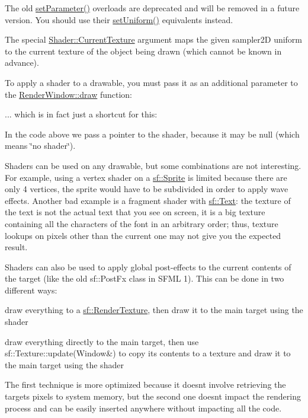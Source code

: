 The old \mbox{\hyperlink{classsf_1_1_shader_a4d6ec78f6de1a0a2146c93ab09d7d762}{set\+Parameter()}} overloads are deprecated and will be removed in a future version. You should use their \mbox{\hyperlink{classsf_1_1_shader_abf78e3bea1e9b0bab850b6b0a0de29c7}{set\+Uniform()}} equivalents instead.

The special \mbox{\hyperlink{classsf_1_1_shader_ac84c7953eec2e19358ea6e2cc5385b8d}{Shader\+::\+Current\+Texture}} argument maps the given {\ttfamily sampler2D} uniform to the current texture of the object being drawn (which cannot be known in advance).

To apply a shader to a drawable, you must pass it as an additional parameter to the \mbox{\hyperlink{classsf_1_1_render_target_a12417a3bcc245c41d957b29583556f39}{Render\+Window\+::draw}} function\+: 
\begin{DoxyCode}{0}
\end{DoxyCode}


... which is in fact just a shortcut for this\+: 
\begin{DoxyCode}{0}
\end{DoxyCode}


In the code above we pass a pointer to the shader, because it may be null (which means \char`\"{}no shader\char`\"{}).

Shaders can be used on any drawable, but some combinations are not interesting. For example, using a vertex shader on a \mbox{\hyperlink{classsf_1_1_sprite}{sf\+::\+Sprite}} is limited because there are only 4 vertices, the sprite would have to be subdivided in order to apply wave effects. Another bad example is a fragment shader with \mbox{\hyperlink{classsf_1_1_text}{sf\+::\+Text}}\+: the texture of the text is not the actual text that you see on screen, it is a big texture containing all the characters of the font in an arbitrary order; thus, texture lookups on pixels other than the current one may not give you the expected result.

Shaders can also be used to apply global post-\/effects to the current contents of the target (like the old sf\+::\+Post\+Fx class in S\+F\+ML 1). This can be done in two different ways\+: \begin{DoxyItemize}
\item draw everything to a \mbox{\hyperlink{classsf_1_1_render_texture}{sf\+::\+Render\+Texture}}, then draw it to the main target using the shader \item draw everything directly to the main target, then use sf\+::\+Texture\+::update(\+Window\&) to copy its contents to a texture and draw it to the main target using the shader\end{DoxyItemize}
The first technique is more optimized because it doesn\textquotesingle{}t involve retrieving the target\textquotesingle{}s pixels to system memory, but the second one doesn\textquotesingle{}t impact the rendering process and can be easily inserted anywhere without impacting all the code.

